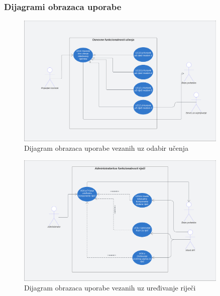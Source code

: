 					
				\subsubsection{Dijagrami obrazaca uporabe}
				\begin{figure}[H]
					\includegraphics[width=0.9\textwidth]{dijagrami/OsnovnaFunkcionalnost.png} 
					\centering
					\caption{Dijagram obrazaca uporabe vezanih uz odabir učenja} 
					\label{fig:class_diagram}
				\end{figure}
					
				\begin{figure}[H]
					\includegraphics[width=0.9\textwidth]{dijagrami/OsnovnaFunkcionalnostAdmina.png} 
					\centering
					\caption{Dijagram obrazaca uporabe vezanih uz uređivanje riječi} 
					\label{fig:class_diagram}
				\end{figure}
					
